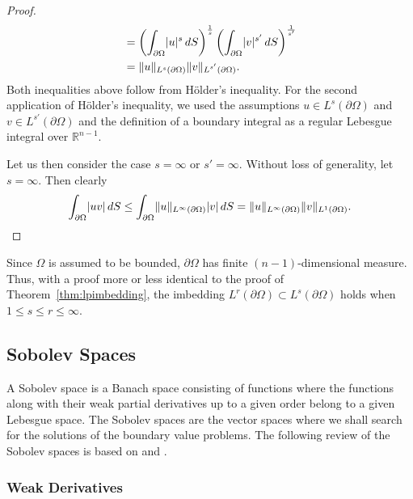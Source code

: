\documentclass[english, 12pt, a4paper, sci, utf8, a-2b, online]{aaltothesis}
\theoremstyle{definition}
\theoremstyle{plain}
\DeclarePairedDelimiter\abs{\lvert}{\rvert}
\DeclarePairedDelimiter\norm{\lVert}{\rVert}
\newcommand*\diff{\mathop{}\!d}
\numberwithin{equation}{section}
\begin{document}
\begin{proof}
\begin{align*}
        &= \left( \int_{\partial \Omega} \abs{u}^s \diff S
                \right)^{\frac{1}{s}}
           \left( \int_{\partial \Omega} \abs{v}^{s'} \diff S
                \right)^{\frac{1}{s'}} \\
        &= \norm{u}_{L^s(\partial \Omega)}
            \norm{v}_{\vphantom{L^s(\partial \Omega)} \smash{L^{s'}(\partial \Omega)}}.
    \end{align*}
    Both inequalities above follow from Hölder's inequality.
    For the second application of Hölder's inequality, we used the assumptions
    $u \in L^s(\partial \Omega)$ and $v \in L^{s'}(\partial \Omega)$
    and the definition of a boundary integral as a regular Lebesgue integral
    over $\mathbb{R}^{n-1}$.

    Let us then consider the case $s=\infty$ or $s'=\infty$.
    Without loss of generality, let $s=\infty$. Then clearly
    \begin{equation*}
        \int_{\partial \Omega} \abs{uv} \diff S
        \leq \int_{\partial \Omega} \norm{u}_{L^{\infty}(\partial \Omega)}
            \abs{v} \diff S
        = \norm{u}_{L^{\infty}(\partial \Omega)} \norm{v}_{L^1(\partial \Omega)}.
    \end{equation*}
\end{proof}
Since $\Omega$ is assumed to be bounded,
$\partial \Omega$ has finite $(n-1)$-dimensional measure.
Thus, with a proof more or less identical to the proof of 
Theorem~\ref{thm:lpimbedding}, the imbedding
$L^r(\partial \Omega) \subset L^s(\partial \Omega)$
holds when $1 \leq s \leq r \leq \infty$.

\subsection{Sobolev Spaces}
\label{subsec:sobolevspaces}

A Sobolev space is a Banach space consisting of functions where the functions
along with their weak partial derivatives up to a given order belong to a given Lebesgue space.
The Sobolev spaces are the vector spaces where we shall search for the solutions
of the boundary value problems. The following review of the Sobolev spaces is based on
\cite{necas2011} and \cite{adams2003}.

\subsubsection{Weak Derivatives}
\label{subsubsec:weakderivatives}
\end{document}

